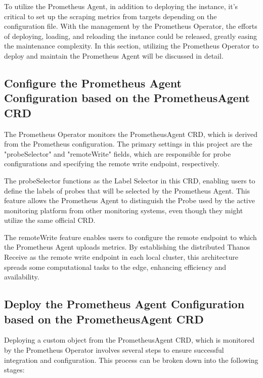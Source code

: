 To utilize the Prometheus Agent, in addition to deploying the instance, it's critical to set up the scraping metrics from targets depending on the configuration file. With the management by the Prometheus Operator, the efforts of deploying, loading, and reloading the instance could be released, greatly easing the maintenance complexity. In this section, utilizing the Prometheus Operator to deploy and maintain the Prometheus Agent will be discussed in detail. 

\subsection{Configure the Prometheus Agent Configuration based on the PrometheusAgent \ac{CRD}}

The Prometheus Operator monitors the PrometheusAgent \ac{CRD}, which is derived from the Prometheus configuration. The primary settings in this project are the "probeSelector" and "remoteWrite" fields, which are responsible for probe configurations and specifying the remote write endpoint, respectively. 

The probeSelector functions as the Label Selector in this \ac{CRD}, enabling users to define the labels of probes that will be selected by the Prometheus Agent. This feature allows the Prometheus Agent to distinguish the Probe used by the active monitoring platform from other monitoring systems, even though they might utilize the same official \ac{CRD}. 

The remoteWrite feature enables users to configure the remote endpoint to which the Prometheus Agent uploads metrics. By establishing the distributed Thanos Receive as the remote write endpoint in each local cluster, this architecture spreads some computational tasks to the edge, enhancing efficiency and availability. 

\subsection{Deploy the Prometheus Agent Configuration based on the PrometheusAgent \ac{CRD}}

Deploying a custom object from the PrometheusAgent \ac{CRD}, which is monitored by the Prometheus Operator involves several steps to ensure successful integration and configuration. This process can be broken down into the following stages:

